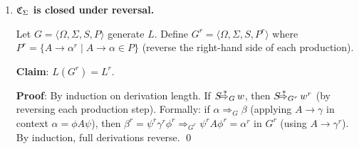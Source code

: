\begin{enumerate}[{9.}1. ]
\begin{enumerate}
\item \textbf{Union}: Not closed. $L_1 = \{\pmb{a}^n\pmb{b}^n\pmb{c}^m \mid n\neq m\}$ and $L_2 = \{\pmb{a}^n\pmb{b}^m\pmb{c}^m \mid n\neq m\}$ are in \XSIG\ (not context free), but $L_1 \cup L_2 \supseteq \{\pmb{a}^n\pmb{b}^n\pmb{c}^n\}$ and $L_1\cup L_2 = \{a^ib^jc^k \mid i\neq k \text{ or } j\neq k\}$ which is not context free. But also $\Sigma^*$ (CFL) is the complement of $\emptyset$ (CFL)... a simpler counterexample: $\overline{L} \cup L = \Sigma^*$ is a CFL, so if both $L$ and $\overline{L}$ are in \XSIG, their union is a CFL $\notin$ \XSIG. So \XSIG\ is \emph{not} closed under union.

\item \textbf{Complement}: Not closed. If $L \in \XSIG$ (L is not CFL), $\overline{L}$ may or may not be in \XSIG. Since CFLs are not closed under complement, there exist non-CFLs whose complements are also non-CFLs, and non-CFLs whose complements are CFLs.

\item \textbf{Intersection}: Not closed. Similar argument.

\item \textbf{Kleene closure}: Not closed. $L = \{\pmb{a}^p \mid p \text{ prime}\} \in \XSIG$ (not regular, hence if unary: not CFL by Parikh), but $L^* = \{\pmb{a}^n \mid n \geq 0 \text{ or sum of primes}\} = \{\pmb{a}^n \mid n \neq 1\} \cup \{\lambda\}$ which is regular (hence CFL). So $L^* \notin \XSIG$.

\item \textbf{Concatenation}: Not closed. $L\cdot\Sigma^*$ for a non-CFL $L$ may be a CFL or not; specific examples show \XSIG\ is not closed.
\end{enumerate}

\item \textbf{$\mathfrak{C}_\Sigma$ is closed under reversal.}

Let $G = \langle\Omega,\Sigma,S,P\rangle$ generate $L$. Define $G^r = \langle\Omega,\Sigma,S,P^r\rangle$ where $P^r = \{A \to \alpha^r \mid A \to \alpha \in P\}$ (reverse the right-hand side of each production).

\textbf{Claim}: $L(G^r) = L^r$.

\textbf{Proof}: By induction on derivation length. If $S \DRightarrow_G w$, then $S \DRightarrow_{G^r} w^r$ (by reversing each production step). Formally: if $\alpha \Rightarrow_G \beta$ (applying $A \to \gamma$ in context $\alpha = \phi A\psi$), then $\beta^r = \psi^r\gamma^r\phi^r \Rightarrow_{G^r} \psi^r A\phi^r = \alpha^r$ in $G^r$ (using $A \to \gamma^r$). By induction, full derivations reverse. \qed


\end{enumerate}

